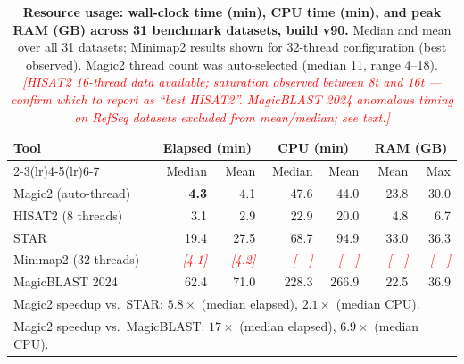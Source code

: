 \documentclass[11pt]{article}
\newcommand{\edcomment}[1]{\textcolor{red}{\textit{[#1]}}}
\begin{document}
\clearpage

\begin{table}[h]
\caption{\textbf{Resource usage: wall-clock time (min), CPU time (min),
  and peak RAM (GB) across 31 benchmark datasets, build v90.}
  Median and mean over all 31 datasets; Minimap2 results shown for
  32-thread configuration (best observed).
  Magic2 thread count was auto-selected (median 11, range 4--18).
  \edcomment{HISAT2 16-thread data available; saturation observed
  between 8t and 16t — confirm which to report as ``best HISAT2''.
  MagicBLAST 2024 anomalous timing on RefSeq datasets excluded from
  mean/median; see text.}}
\label{tab:timing}
\small
\begin{tabular}{lrrrrrr}
\toprule
\textbf{Tool} & \multicolumn{2}{c}{\textbf{Elapsed (min)}} &
               \multicolumn{2}{c}{\textbf{CPU (min)}} &
               \multicolumn{2}{c}{\textbf{RAM (GB)}} \\
\cmidrule(lr){2-3}\cmidrule(lr){4-5}\cmidrule(lr){6-7}
 & Median & Mean & Median & Mean & Mean & Max \\
\midrule
Magic2 (auto-thread)     & \textbf{4.3} & 4.1 & 47.6 & 44.0 & 23.8 & 30.0 \\
HISAT2 (8 threads)       & 3.1 & 2.9 & 22.9 & 20.0 & 4.8 & 6.7 \\
STAR                     & 19.4 & 27.5 & 68.7 & 94.9 & 33.0 & 36.3 \\
Minimap2 (32 threads)    & \edcomment{4.1} & \edcomment{4.2} &
                           \edcomment{—} & \edcomment{—} &
                           \edcomment{—} & \edcomment{—} \\
MagicBLAST 2024          & 62.4 & 71.0 & 228.3 & 266.9 & 22.5 & 36.9 \\
\midrule
\multicolumn{7}{l}{\small Magic2 speedup vs.\ STAR: $5.8\times$ (median elapsed),
  $2.1\times$ (median CPU).} \\
\multicolumn{7}{l}{\small Magic2 speedup vs.\ MagicBLAST: $17\times$ (median elapsed),
  $6.9\times$ (median CPU).} \\
\bottomrule
\end{tabular}
\end{table}

\clearpage
\end{document}
